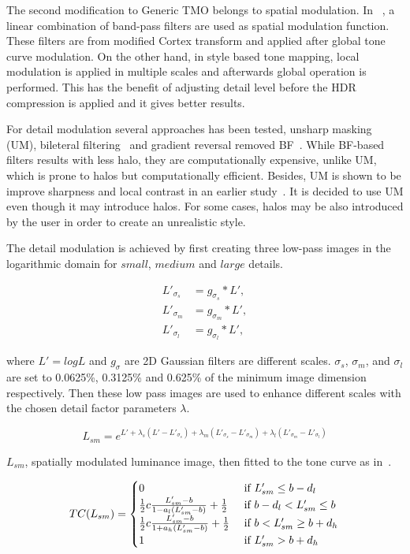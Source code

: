 The second modification to Generic TMO belongs to spatial modulation. In ~\cite{mantiuk2008modeling}, a linear combination of band-pass filters are used as spatial modulation function. These filters are from modified Cortex transform and applied after global tone curve modulation. On the other hand, in style based tone mapping, local modulation is applied in multiple scales and afterwards global operation is performed. This has the benefit of adjusting detail level before the HDR compression is applied and it gives better results. 

For detail modulation several approaches has been tested, unsharp masking (UM), bileteral filtering~\cite{Tomasi98} and gradient reversal removed BF~\cite{Bae2006}. While BF-based filters results with less halo, they are computationally expensive, unlike UM, which is prone to halos but computationally efficient. Besides, UM is shown to be improve sharpness and local contrast in an earlier study~\cite{Trenta2012}. It is decided to use UM even though it may introduce halos. For some cases, halos may be also introduced by the user in order to create an unrealistic style.

The detail modulation is achieved by first creating three low-pass images in the logarithmic domain for $small$, $medium$ and $large$ details.

\begin{align}
L'_{\sigma_s} &= g _{\sigma_s} * L', \\
L'_{\sigma_m} &= g _{\sigma_m} * L', \\
L'_{\sigma_l} &= g _{\sigma_l} * L', 
\end{align}

where $L' = log L$ and $g_\sigma$ are 2D Gaussian filters are different scales. $\sigma_s$, $\sigma_m$, and $\sigma_l$ are set to 0.0625\%, 0.3125\% and 0.625\% of the minimum image dimension respectively. Then these low pass images are used to enhance different scales with the chosen detail factor parameters $\lambda$.

\begin{equation}
    L_{sm} = e^{L' + \lambda_s(L' - L'_{\sigma_s}) + \lambda_m(L'_{\sigma_s} - L'_{\sigma_m}) + \lambda_l(L'_{\sigma_m} - L'_{\sigma_l})}
\end{equation}

$L_{sm}$, spatially modulated luminance image, then fitted to the tone curve as in~\cite{mantiuk2008modeling}. 

\begin{equation}
    TC(L_{sm}) = 
    \begin{cases}
    0 &\text{  if  $L_{sm}' \leq b - d_l$ } \\
    \frac{1}{2}c {{L_{sm}' - b}\over{1 - a_l(L_{sm}'-b)}} + \frac{1}{2} &\text{ if $b - d_l < L_{sm}' \leq b $ } \\ 
    \frac{1}{2}c {{L_{sm}' - b}\over{1 + a_h(L_{sm}'-b)}} + \frac{1}{2} &\text{ if $b < L_{sm}' \geq b + d_h$} \\ 
    1 &\text{ if  $L_{sm}' > b + d_h$}
    \end{cases}
\end{equation}


